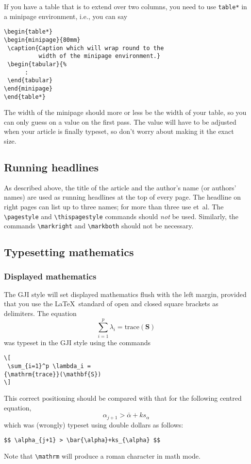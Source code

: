 \documentclass{gji}
\begin{document}
If you have a table that is to extend over two columns, you need to use
\verb"table*" in a minipage environment, i.e., you can say
\begin{verbatim}
\begin{table*}
\begin{minipage}{80mm}
 \caption{Caption which will wrap round to the
          width of the minipage environment.}
 \begin{tabular}{%
      :
 \end{tabular}
\end{minipage}
\end{table*}
\end{verbatim}
The width of the minipage should more or less be the width of your table,
so you can only guess on a value on the first pass. The value will have to
be adjusted when your article is finally typeset, so don't worry
about making it the exact size.

\subsection{Running headlines}

As described above, the title of the article and the author's name (or
authors' names) are used as running headlines at the top of every page.
The headline on right pages can list up to three names; for more than
three use et~al. The \verb"\pagestyle" and \verb"\thispagestyle"
commands should {\em not\/} be used. Similarly, the commands
\verb"\markright" and \verb"\markboth" should not be necessary.

\subsection{Typesetting mathematics}

\subsubsection{Displayed mathematics}

The GJI style will set displayed mathematics flush with the left margin,
provided that you use the \LaTeX\ standard of open and closed square brackets
as delimiters. The equation
\[
 \sum_{i=1}^p \lambda_i =
{\mathrm{trace}}(\mathbf{S})
\]
was typeset in the GJI style using the commands
\begin{verbatim}
\[
 \sum_{i=1}^p \lambda_i =
{\mathrm{trace}}(\mathbf{S})
\]
\end{verbatim}
This correct positioning should be compared with that for
the following centred equation,
$$ \alpha_{j+1} > \bar{\alpha}+ks_{\alpha} $$
which was (wrongly) typeset using double dollars as follows:
\begin{verbatim}
$$ \alpha_{j+1} > \bar{\alpha}+ks_{\alpha} $$
\end{verbatim}
Note that \verb"\mathrm" will produce a roman character
in math mode.
\end{document}
